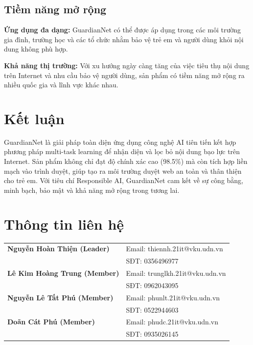 \documentclass[12pt,a4paper]{article}
\begin{document}
\subsection{Tiềm năng mở rộng}

\textbf{Ứng dụng đa dạng:} GuardianNet có thể được áp dụng trong các môi trường gia đình, trường học và các tổ chức nhằm bảo vệ trẻ em và người dùng khỏi nội dung không phù hợp.

\textbf{Khả năng thị trường:} Với xu hướng ngày càng tăng của việc tiêu thụ nội dung trên Internet và nhu cầu bảo vệ người dùng, sản phẩm có tiềm năng mở rộng ra nhiều quốc gia và lĩnh vực khác nhau.

\section{Kết luận}

GuardianNet là giải pháp toàn diện ứng dụng công nghệ AI tiên tiến kết hợp phương pháp multi-task learning để nhận diện và lọc bỏ nội dung bạo lực trên Internet. Sản phẩm không chỉ đạt độ chính xác cao (98.5\%) mà còn tích hợp liền mạch vào trình duyệt, giúp tạo ra môi trường duyệt web an toàn và thân thiện cho trẻ em. Với tiêu chí Responsible AI, GuardianNet cam kết về sự công bằng, minh bạch, bảo mật và khả năng mở rộng trong tương lai.


\section{Thông tin liên hệ}

\begin{tcolorbox}[colback=white, colframe=guardianblue, arc=3mm, title=Thông tin liên hệ đội AIGenerated]
\begin{tabular}{@{}p{4.5cm}|p{8cm}@{}}
\textbf{Nguyễn Hoàn Thiện (Leader)} & 
Email: thiennh.21it@vku.udn.vn \\
& SĐT: 0356496977 \\
\midrule
\textbf{Lê Kim Hoàng Trung (Member)} & 
Email: trunglkh.21it@vku.udn.vn \\
& SĐT: 0962043095 \\
\midrule
\textbf{Nguyễn Lê Tất Phú (Member)} & 
Email: phunlt.21it@vku.udn.vn \\
& SĐT: 0522944603 \\
\midrule
\textbf{Doãn Cát Phú (Member)} & 
Email: phudc.21it@vku.udn.vn \\
& SĐT: 0935026145 \\

\end{tabular}
\end{tcolorbox}
\end{document}

